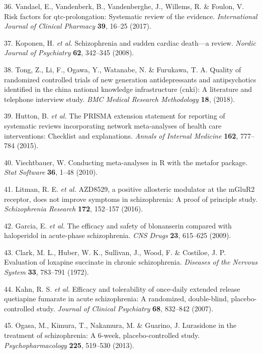 \documentclass[9pt,english,,jou,floatsintext]{apa6}
\begin{document}
\hypertarget{ref-Vandael2017}{}
36. Vandael, E., Vandenberk, B., Vandenberghe, J., Willems, R. \&
Foulon, V. Risk factors for qtc-prolongation: Systematic review of the
evidence. \emph{International Journal of Clinical Pharmacy} \textbf{39},
16--25 (2017).

\hypertarget{ref-Koponen2008}{}
37. Koponen, H. \emph{et al.} Schizophrenia and sudden cardiac death---a
review. \emph{Nordic Journal of Psychiatry} \textbf{62}, 342--345
(2008).

\hypertarget{ref-Tong2018}{}
38. Tong, Z., Li, F., Ogawa, Y., Watanabe, N. \& Furukawa, T. A. Quality
of randomized controlled trials of new generation antidepressants and
antipsychotics identified in the china national knowledge infrastructure
(cnki): A literature and telephone interview study. \emph{BMC Medical
Research Methodology} \textbf{18}, (2018).

\hypertarget{ref-Hutton2015}{}
39. Hutton, B. \emph{et al.} The PRISMA extension statement for
reporting of systematic reviews incorporating network meta-analyses of
health care interventions: Checklist and explanations. \emph{Annals of
Internal Medicine} \textbf{162}, 777--784 (2015).

\hypertarget{ref-Viechtbauer2010}{}
40. Viechtbauer, W. Conducting meta-analyses in R with the metafor
package. \emph{Stat Software} \textbf{36}, 1--48 (2010).

\hypertarget{ref-Litman2016}{}
41. Litman, R. E. \emph{et al.} AZD8529, a positive allosteric modulator
at the mGluR2 receptor, does not improve symptoms in schizophrenia: A
proof of principle study. \emph{Schizophrenia Research} \textbf{172},
152--157 (2016).

\hypertarget{ref-Garcia2009}{}
42. Garcia, E. \emph{et al.} The efficacy and safety of blonanserin
compared with haloperidol in acute-phase schizophrenia. \emph{CNS Drugs}
\textbf{23}, 615--625 (2009).

\hypertarget{ref-Clark1972}{}
43. Clark, M. L., Huber, W. K., Sullivan, J., Wood, F. \& Costiloe, J.
P. Evaluation of loxapine succinate in chronic schizophrenia.
\emph{Diseases of the Nervous System} \textbf{33}, 783--791 (1972).

\hypertarget{ref-Kahn2007}{}
44. Kahn, R. S. \emph{et al.} Efficacy and tolerability of once-daily
extended release quetiapine fumarate in acute schizophrenia: A
randomized, double-blind, placebo-controlled study. \emph{Journal of
Clinical Psychiatry} \textbf{68}, 832--842 (2007).

\hypertarget{ref-Ogasa2013}{}
45. Ogasa, M., Kimura, T., Nakamura, M. \& Guarino, J. Lurasidone in the
treatment of schizophrenia: A 6-week, placebo-controlled study.
\emph{Psychopharmacology} \textbf{225}, 519--530 (2013).
\end{document}
